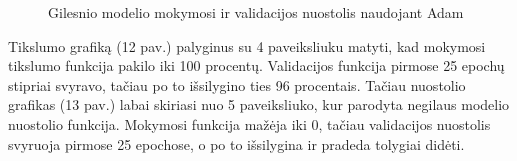 \documentclass{VUMIFPSkursinis}
\begin{document}
\begin{figure}[!htbp]
\begin{minipage}[b]{0.49\textwidth}
    \caption{Gilesnio modelio mokymosi ir validacijos nuostolis naudojant Adam}
  \end{minipage}
\end{figure}

Tikslumo grafiką (12 pav.) palyginus su 4 paveiksliuku matyti, kad mokymosi tikslumo funkcija pakilo iki 100 procentų. Validacijos funkcija pirmose 25 epochų 
stipriai svyravo, tačiau po to išsilygino ties 96 procentais. 
Tačiau nuostolio grafikas (13 pav.) labai skiriasi nuo 5 paveiksliuko, kur parodyta negilaus modelio nuostolio funkcija. Mokymosi funkcija mažėja iki 0, tačiau validacijos nuostolis svyruoja pirmose 25 epochose, o po to išsilygina ir pradeda tolygiai didėti.

\end{document}
